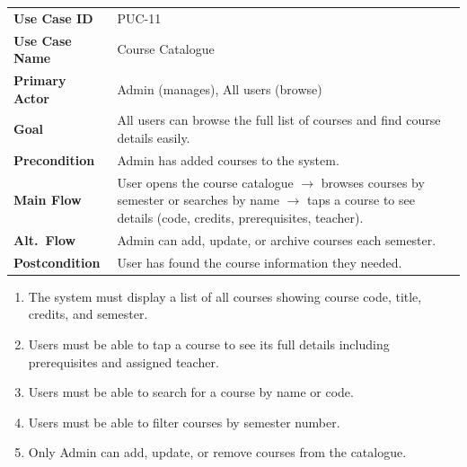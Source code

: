 \documentclass[12pt,a4paper]{article}
\begin{document}
\begin{tcolorbox}[pucbox, title={Product Use Case --- PUC-11}]
\begin{tabularx}{\linewidth}{p{3.5cm} X}
\textbf{Use Case ID}    & PUC-11 \\
\textbf{Use Case Name}  & Course Catalogue \\
\textbf{Primary Actor}  & Admin (manages), All users (browse) \\
\textbf{Goal}           & All users can browse the full list of courses and find course details easily. \\
\textbf{Precondition}   & Admin has added courses to the system. \\
\textbf{Main Flow}      & User opens the course catalogue $\rightarrow$ browses courses by semester or searches by name $\rightarrow$ taps a course to see details (code, credits, prerequisites, teacher). \\
\textbf{Alt.\ Flow}     & Admin can add, update, or archive courses each semester. \\
\textbf{Postcondition}  & User has found the course information they needed. \\
\end{tabularx}
\end{tcolorbox}

\begin{tcolorbox}[frbox, title={Functional Requirements --- PUC-11}]
\begin{enumerate}[leftmargin=*, label=\textbf{FR-11.\arabic*}, itemsep=5pt]
  \item The system must display a list of all courses showing course code, title, credits, and semester.
  \item Users must be able to tap a course to see its full details including prerequisites and assigned teacher.
  \item Users must be able to search for a course by name or code.
  \item Users must be able to filter courses by semester number.
  \item Only Admin can add, update, or remove courses from the catalogue.
\end{enumerate}
\end{tcolorbox}
\end{document}
